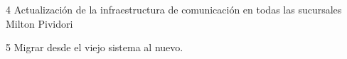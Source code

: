\begin{proyecto}
{4}
{Actualización de la infraestructura de comunicación en todas las sucursales}
{Milton Pividori}

  \begin{etapas}
    \etapa {}
  \end{etapas}

  \begin{recursos}
    \recurso {}
  \end{recursos}

  \tiempo {}
\end{proyecto}


\begin{proyecto}
{5}
{Migrar desde el viejo sistema al nuevo.}
{}

  \begin{etapas}
    \etapa {}
  \end{etapas}

  \begin{recursos}
    \recurso {}
  \end{recursos}

  \tiempo {}
\end{proyecto}


